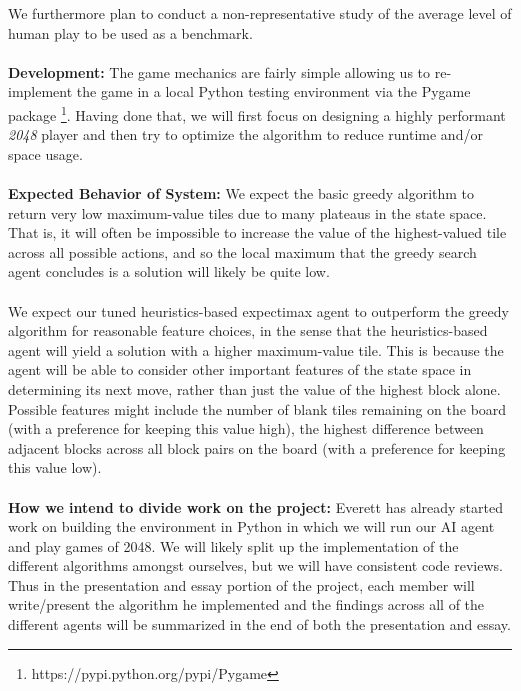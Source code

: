 \documentclass[12pt]{article}
\begin{document}
\noindent We furthermore plan to conduct a non-representative study of the average level of human play to be used as a benchmark.
\\\\
\textbf{Development: } The game mechanics are fairly simple allowing us to re-implement the game in a local Python testing environment via the Pygame package \footnote{https://pypi.python.org/pypi/Pygame}. Having done that, we will first focus on designing a highly performant \textit{2048} player and then try to optimize the algorithm to reduce runtime and/or space usage.
\\\\
\textbf{Expected Behavior of System: }
We expect the basic greedy algorithm to return very low maximum-value tiles due to many plateaus in the state space.  That is, it will often be impossible to increase the value of the highest-valued tile across all possible actions, and so the local maximum that the greedy search agent concludes is a solution will likely be quite low.
\\\\
We expect our tuned heuristics-based expectimax agent to outperform the greedy algorithm for reasonable feature choices, in the sense that the heuristics-based agent will yield a solution with a higher maximum-value tile.  This is because the agent will be able to consider other important features of the state space in determining its next move, rather than just the value of the highest block alone.  Possible features might include the number of blank tiles remaining on the board (with a preference for keeping this value high), the highest difference between adjacent blocks across all block pairs on the board (with a preference for keeping this value low).\\\\
\textbf{How we intend to divide work on the project: } Everett has already started work on building the environment in Python in which we will run our AI agent and play games of 2048.  We will likely split up the implementation of the different algorithms amongst ourselves, but we will have consistent code reviews.  Thus in the presentation and essay portion of the project, each member will write/present the algorithm he implemented and the findings across all of the different agents will be summarized in the end of both the presentation and essay.

\newpage
\end{document}
